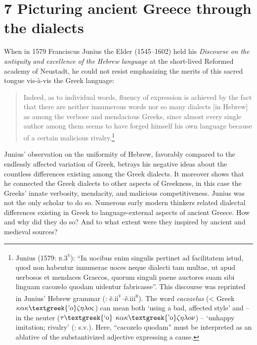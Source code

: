 \documentclass[output=paper]{langsci/langscibook}
\begin{document}
\section{\textsc{7} Picturing ancient Greece through the dialects}
\hypertarget{Toc19704849}{}
When in 1579 Franciscus Junius the Elder (1545–1602) held his \textit{Discourse} \textit{on} \textit{the} \textit{antiquity} \textit{and} \textit{excellence} \textit{of} \textit{the} \textit{Hebrew} \textit{language} at the short-lived Reformed academy of Neustadt, he could not resist emphasizing the merits of this sacred tongue vis-à-vis the Greek language:

\begin{quote}
Indeed, as to individual words, fluency of expression is achieved by the fact that there are neither innumerous words nor so many dialects [in Hebrew] as among the verbose and mendacious Greeks, since almost every single author among them seems to have forged himself his own language because of a certain malicious rivalry.\footnote{Junius (1579: \textsc{b.3}\textsc{\textsuperscript{v}}): “In uocibus enim singulis pertinet ad facilitatem istud, quod non habentur innumerae uoces neque dialecti tam multae, ut apud uerbosos et mendaces Graecos, quorum singuli paene auctores suam sibi linguam cacozelo quodam uidentur fabricasse”. This discourse was reprinted in Junius’ Hebrew grammar (\citealt{Junius1580}: ẽ.ii\textsc{\textsuperscript{v}}–ẽ.iii\textsc{\textsuperscript{r}}). The word \textit{cacozelus} (< Greek $\kappa \alpha \kappa \text{\textgreek{'o}}\zeta \eta \lambda o\varsigma $) can mean both ‘using a bad, affected style’ and – in the neuter ($\tau \text{\textgreek{`o}}$ $\kappa \alpha \kappa \text{\textgreek{'o}}\zeta \eta \lambda o\nu $) – ‘unhappy imitation; rivalry’ (\citealt{LiddellScott1940}: s.v.). Here, “cacozelo quodam” must be interpreted as an ablative of the substantivized adjective expressing a cause.}
\end{quote}

Junius’ observation on the uniformity of Hebrew, favorably compared to the endlessly affected variation of Greek, betrays his negative ideas about the countless differences existing among the Greek dialects. It moreover shows that he connected the Greek dialects to other aspects of Greekness, in this case the Greeks’ innate verbosity, mendacity, and malicious competitiveness. Junius was not the only scholar to do so. Numerous early modern thinkers related dialectal differences existing in Greek to language-external aspects of ancient Greece. How and why did they do so? And to what extent were they inspired by ancient and medieval sources?
\end{document}
